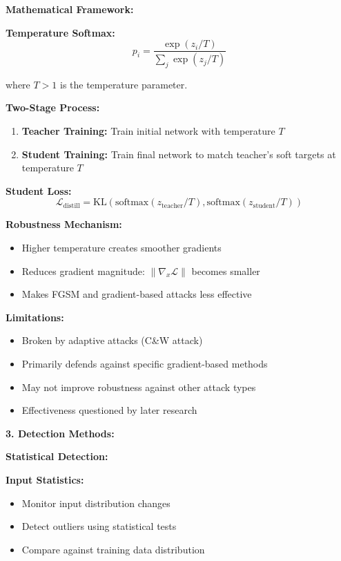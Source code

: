 \documentclass[12pt]{article}
\begin{document}
\begin{enumerate}[(a)]
{    \textbf{Mathematical Framework:}
    
    \textbf{Temperature Softmax:}
    $$p_i = \frac{\exp(z_i/T)}{\sum_j \exp(z_j/T)}$$
    
    where $T > 1$ is the temperature parameter.
    
    \textbf{Two-Stage Process:}
    \begin{enumerate}
        \item \textbf{Teacher Training:} Train initial network with temperature $T$
        \item \textbf{Student Training:} Train final network to match teacher's soft targets at temperature $T$
    \end{enumerate}
    
    \textbf{Student Loss:}
    $$\mathcal{L}_{\text{distill}} = \text{KL}(\text{softmax}(z_{\text{teacher}}/T), \text{softmax}(z_{\text{student}}/T))$$
    
    \textbf{Robustness Mechanism:}
    \begin{itemize}
        \item Higher temperature creates smoother gradients
        \item Reduces gradient magnitude: $\|\nabla_x \mathcal{L}\|$ becomes smaller
        \item Makes FGSM and gradient-based attacks less effective
    \end{itemize}
    
    \textbf{Limitations:}
    \begin{itemize}
        \item Broken by adaptive attacks (C\&W attack)
        \item Primarily defends against specific gradient-based methods
        \item May not improve robustness against other attack types
        \item Effectiveness questioned by later research
    \end{itemize}
    
    \textbf{3. Detection Methods:}
    
    \textbf{Statistical Detection:}
    
    \textbf{Input Statistics:}
    \begin{itemize}
        \item Monitor input distribution changes
        \item Detect outliers using statistical tests
        \item Compare against training data distribution
    \end{itemize}
    
}
\end{enumerate}
\end{document}
